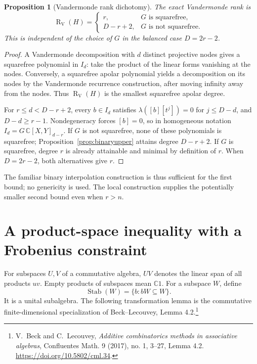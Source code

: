 \documentclass[11pt]{article}
\newtheorem{proposition}[theorem]{Proposition}
\theoremstyle{definition}
\theoremstyle{remark}
\newcommand{\C}{\mathbb C}
\newcommand{\VR}{\operatorname{R}_{\mathrm V}}
\newcommand{\Stab}{\operatorname{Stab}}
\begin{document}
\begin{proposition}[Vandermonde rank dichotomy]\label{prop:vandermonde}
The exact Vandermonde rank is
\[
 \VR(H)=\begin{cases}
 r,&G\text{ is squarefree},\\
 D-r+2,&G\text{ is not squarefree}.
 \end{cases}
\]
This is independent of the choice of $G$ in the balanced case $D=2r-2$.
\end{proposition}
\begin{proof}
A Vandermonde decomposition with $d$ distinct projective nodes gives a
squarefree polynomial in $I_d$: take the product of the linear forms vanishing
at the nodes. Conversely, a squarefree apolar polynomial yields a decomposition
on its nodes by the Vandermonde recurrence construction, after moving infinity
away from the nodes. Thus $\VR(H)$ is the smallest squarefree apolar degree.

For $r\le d<D-r+2$, every $b\in I_d$ satisfies
$\lambda([b][t^j])=0$ for $j\le D-d$, and $D-d\ge r-1$.
Nondegeneracy forces $[b]=0$, so in homogeneous notation
$I_d=G\,\C[X,Y]_{d-r}$. If $G$ is not squarefree, none of these polynomials
is squarefree; Proposition~\ref{prop:binaryupper} attains degree $D-r+2$.
If $G$ is squarefree, degree $r$ is already attainable and minimal by definition
of $r$. When $D=2r-2$, both alternatives give $r$.
\end{proof}

The familiar binary interpolation construction is thus sufficient for the
first bound; no genericity is used. The local construction supplies the
potentially smaller second bound even when $r>n$.

\section{A product-space inequality with a Frobenius constraint}\label{sec:product}

For subspaces $U,V$ of a commutative algebra, $UV$ denotes the linear span of
all products $uv$. Empty products of subspaces mean $\C1$.
For a subspace $W$, define
\[
 \Stab(W)=\{b:bW\subseteq W\}.
\]
It is a unital subalgebra.
The following transformation lemma is the commutative finite-dimensional
specialization of Beck--Lecouvey, Lemma 4.2.\footnote{V.~Beck and C.~Lecouvey,
\emph{Additive combinatorics methods in associative algebras}, Confluentes
Math. 9 (2017), no. 1, 3--27, Lemma 4.2.
\url{https://doi.org/10.5802/cml.34}.}
\end{document}
